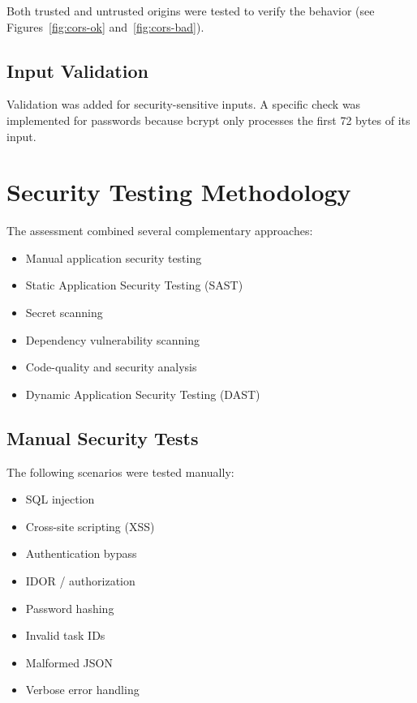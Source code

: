 \documentclass[11pt,a4paper]{article}
\begin{document}
Both trusted and untrusted origins were tested to verify the behavior (see Figures~\ref{fig:cors-ok} and~\ref{fig:cors-bad}).

\subsection{Input Validation}
Validation was added for security-sensitive inputs. A specific check was implemented for passwords because bcrypt only processes the first 72 bytes of its input.

\section{Security Testing Methodology}

The assessment combined several complementary approaches:

\begin{itemize}[leftmargin=*]
\item Manual application security testing
\item Static Application Security Testing (SAST)
\item Secret scanning
\item Dependency vulnerability scanning
\item Code-quality and security analysis
\item Dynamic Application Security Testing (DAST)
\end{itemize}

\subsection{Manual Security Tests}
The following scenarios were tested manually:

\begin{itemize}[leftmargin=*]
\item SQL injection
\item Cross-site scripting (XSS)
\item Authentication bypass
\item IDOR / authorization
\item Password hashing
\item Invalid task IDs
\item Malformed JSON
\item Verbose error handling
\end{itemize}
\end{document}
